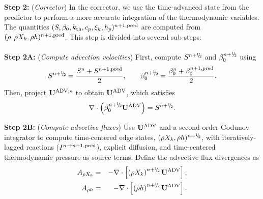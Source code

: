 {\bf Step 2:} ({\it Corrector}) In the corrector, we use the time-advanced state from the predictor to perform a more accurate integration of the thermodynamic variables.  The quantities $(S, \beta_0, k_{\rm th}, c_p, \xi_k, h_p)^{n+1,{\rm pred}}$ are computed from $(\rho,\rho X_k,\rho h)^{n+1,{\rm pred}}$.  This step is divided into several sub-steps:\\\\

{\bf Step 2A:} ({\it Compute advection velocities}) First, compute $S^{n+\myhalf}$ and $\beta_0^{n+\myhalf}$ using
\begin{equation}
S^{n+\myhalf} = \frac{S^n + S^{n+1,{\rm pred}}}{2}, \qquad \beta_0^{n+\myhalf} = \frac{\beta_0^n + \beta_0^{n+1,{\rm pred}}}{2}.
\end{equation}
Then, project $\mathbf{U}^{\mathrm{ADV},\star}$ to obtain $\mathbf{U}^{\mathrm{ADV}}$, which satisfies
\begin{equation}
\nabla\cdot\left(\beta_0^{n+\myhalf}\uadvsdc\right) = S^{n+\myhalf}.
\end{equation}

{\bf Step 2B:} ({\it Compute advective fluxes}) Use $\mathbf{U}^{\mathrm{ADV}}$ and a second-order Godunov integrator to compute time-centered edge states, $(\rho X_k, \rho h)^{n+\myhalf}$, with iteratively-lagged reactions ($I^{n\rightarrow n+1,{\rm pred}}$), explicit diffusion, and time-centered thermodynamic pressure as source terms.  Define the advective flux divergences as
\begin{eqnarray}
A_{\rho X_k} &=& -\nabla\cdot\left[\left(\rho X_k\right)^{n+\myhalf}\uadvsdc\right],\\
A_{\rho h} &=& -\nabla\cdot\left[\left(\rho h\right)^{n+\myhalf}\uadvsdc\right].
\end{eqnarray}

